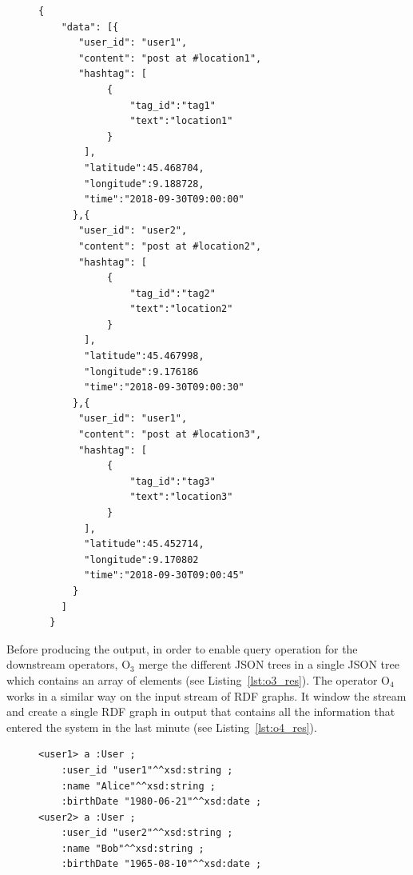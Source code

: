 \begin{Example}
\begin{figure}[ht]
\begin{minipage}{0.95\linewidth}
\begin{lstlisting}[caption={Example of result of the O$_3$ operators.},label=lst:o3_res,style=JSON]
  {
    "data": [{
       "user_id": "user1",
       "content": "post at #location1",
       "hashtag": [
            { 
                "tag_id":"tag1"
                "text":"location1"
            }
        ],
        "latitude":45.468704,
        "longitude":9.188728,
        "time":"2018-09-30T09:00:00"
      },{
       "user_id": "user2",
       "content": "post at #location2",
       "hashtag": [
            { 
                "tag_id":"tag2"
                "text":"location2"
            }
        ],
        "latitude":45.467998,
        "longitude":9.176186
        "time":"2018-09-30T09:00:30"
      },{
       "user_id": "user1",
       "content": "post at #location3",
       "hashtag": [
            { 
                "tag_id":"tag3"
                "text":"location3"
            }
        ],
        "latitude":45.452714,
        "longitude":9.170802
        "time":"2018-09-30T09:00:45"
      }
    ]
  }
\end{lstlisting}
\end{minipage}
\end{figure}

Before producing the output, in order to enable query operation for the downstream operators, O$_3$ merge the different JSON trees in a single JSON tree which contains an array of elements (see Listing~\ref{lst:o3_res}).
The operator O$_4$ works in a similar way on the input stream of RDF graphs. It window the stream and create a single RDF graph in output that contains all the information that entered the system in the last minute (see Listing~\ref{lst:o4_res}).

\begin{figure}[ht]
\begin{minipage}{0.95\linewidth}
\begin{lstlisting}[caption={Example of result of the O$_4$ operators.},label=lst:o4_res,style=N3]
<user1> a :User ;
    :user_id "user1"^^xsd:string ;
    :name "Alice"^^xsd:string ;
    :birthDate "1980-06-21"^^xsd:date ;
<user2> a :User ;
    :user_id "user2"^^xsd:string ;
    :name "Bob"^^xsd:string ;
    :birthDate "1965-08-10"^^xsd:date ;
\end{lstlisting}
\end{minipage}
\end{figure}

\end{Example}

